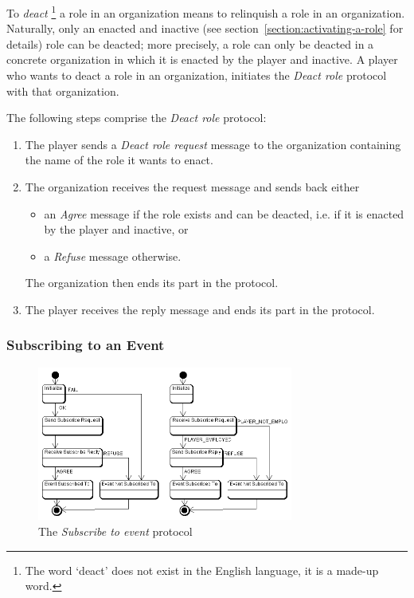 To \textit{deact}
\footnote{The word `deact' does not exist in the English language, it is a made-up word.}
a role in an organization means to relinquish a role in an organization.
Naturally, only an enacted and inactive (see section~\ref{section:activating-a-role} for details) role can be deacted; more precisely, a role can only be deacted in a concrete organization in which it is enacted by the player and inactive.
A player who wants to deact a role in an organization, initiates the \textit{Deact role} protocol with that organization.

The following steps comprise the \textit{Deact role} protocol:
\begin{enumerate}
	\item The player sends a \textit{Deact role request} message to the organization containing the name of the role it wants to enact.
	\item The organization receives the request message and sends back either
	\begin{itemize}
		\item an \textit{Agree} message if the role exists and can be deacted, i.e. if it is enacted by the player and inactive, or
		\item a \textit{Refuse} message otherwise. 
	\end{itemize}
	The organization then ends its part in the protocol.
	\item The player receives the reply message and ends its part in the protocol.
\end{enumerate}

\subsubsection{Subscribing to an Event}

\begin{figure}[ht]
	\centering
	\includegraphics[width=0.75\textwidth]{images/thespian/subscribe-to-event-protocol.png}
	\caption{The \textit{Subscribe to event} protocol}
	\label{figure:thespian-subscribe-to-event-protocol}
\end{figure}

